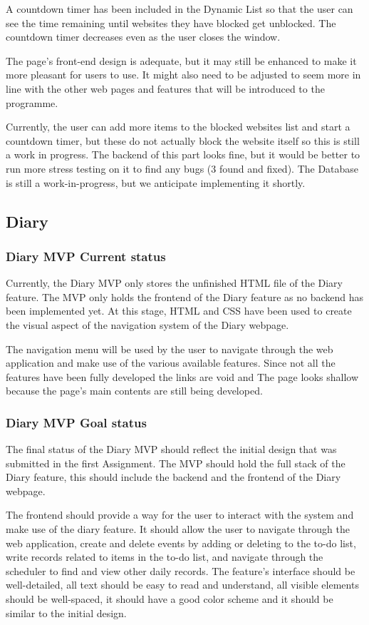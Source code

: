 \documentclass[a4paper]{article}
\begin{document}
{A countdown timer has been included in the Dynamic List so that the user can see the time remaining until websites they have blocked get unblocked. The countdown timer decreases even  as the user closes the window.

The page's front-end design is adequate, but it may still be enhanced to make it more pleasant for users to use. It might also need to be adjusted to seem more in line with the other web pages and features that will be introduced to the programme.

Currently, the user can add more items to the blocked websites list and start a countdown timer, but these do not actually block the website itself so this is still a work in progress. The backend of this part looks fine, but it would be better to run more stress testing on it to find any bugs (3 found and fixed).
The Database is still a work-in-progress, but we anticipate implementing it shortly.

\subsection{Diary}

\subsubsection*{Diary MVP Current status}
Currently, the Diary MVP only stores the unfinished HTML file of the Diary feature. The MVP only holds the frontend of the Diary feature as no backend has been implemented yet. At this stage, HTML and CSS have been used to create the visual aspect of the navigation system of the Diary webpage. 

The navigation menu will be used by the user to navigate through the web application and make use of the various available features. Since not all the features have been fully developed the links are void and The page looks shallow because the page's main contents are still being developed. 

\subsubsection*{Diary MVP Goal status}
The final status of the Diary MVP should reflect the initial design that was submitted in the first Assignment. The MVP should hold the full stack of the Diary feature, this should include the backend and the frontend of the Diary webpage. 

The frontend should provide a way for the user to interact with the system and make use of the diary feature. It should allow the user to navigate through the web application, create and delete events by adding or deleting to the to-do list, write records related to items in the to-do list, and navigate through the scheduler to find and view other daily records. The feature’s interface should be well-detailed, all text should be easy to read and understand, all visible elements should be well-spaced, it should have a good color scheme and it should be similar to the initial design.  

}
\end{document}
